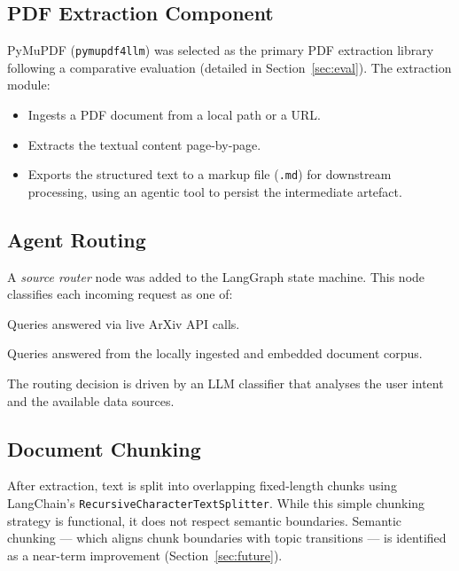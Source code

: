 \documentclass[12pt, a4paper]{article}
\begin{document}
\subsection{PDF Extraction Component}

PyMuPDF (\texttt{pymupdf4llm}) was selected as the primary PDF
extraction library following a comparative evaluation (detailed in
Section~\ref{sec:eval}). The extraction module:

\begin{itemize}[leftmargin=*]
    \item Ingests a PDF document from a local path or a URL.
    \item Extracts the textual content page-by-page.
    \item Exports the structured text to a markup file (\texttt{.md})
          for downstream processing, using an agentic tool to persist the
          intermediate artefact.
\end{itemize}

\subsection{Agent Routing}

A \emph{source router} node was added to the LangGraph state machine.
This node classifies each incoming request as one of:

\begin{description}[leftmargin=*]
    \item[\texttt{arxiv\_live}] Queries answered via live ArXiv API calls.
    \item[\texttt{local\_document}] Queries answered from the locally
          ingested and embedded document corpus.
\end{description}

The routing decision is driven by an LLM classifier that analyses the
user intent and the available data sources.

\subsection{Document Chunking}

After extraction, text is split into overlapping fixed-length chunks
using LangChain's \texttt{RecursiveCharacterTextSplitter}. While this
simple chunking strategy is functional, it does not respect semantic
boundaries. Semantic chunking --- which aligns chunk boundaries with
topic transitions --- is identified as a near-term improvement
(Section~\ref{sec:future}).
\end{document}
